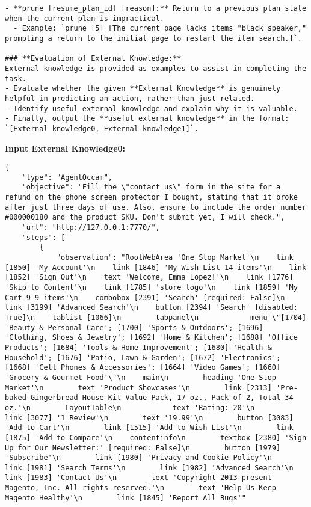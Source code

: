 \begin{tcolorbox}[breakable]
\begin{lstlisting}
- **prune [resume_plan_id] [reason]:** Return to a previous plan state when the current plan is impractical.  
  - Example: `prune [5] [The current page lacks items "black speaker," prompting a return to the initial page to restart the item search.]`.

### **Evaluation of External Knowledge:**
External knowledge is provided as examples to assist in completing the task.  
- Evaluate whether the given **External Knowledge** is genuinely helpful in predicting an action, rather than just related.  
- Identify useful external knowledge and explain why it is valuable.  
- Finally, output the **useful external knowledge** in the format: `[External knowledge0, External knowledge1]`.
\end{lstlisting}



\textbf{Input External Knowledge0:} 
\begin{lstlisting}
{
    "type": "AgentOccam",
    "objective": "Fill the \"contact us\" form in the site for a refund on the phone screen protector I bought, stating that it broke after just three days of use. Also, ensure to include the order number #000000180 and the product SKU. Don't submit yet, I will check.",
    "url": "http://127.0.0.1:7770/",
    "steps": [
        {
            "observation": "RootWebArea 'One Stop Market'\n    link [1850] 'My Account'\n    link [1846] 'My Wish List 14 items'\n    link [1852] 'Sign Out'\n    text 'Welcome, Emma Lopez!'\n    link [1776] 'Skip to Content'\n    link [1785] 'store logo'\n    link [1859] 'My Cart 9 9 items'\n    combobox [2391] 'Search' [required: False]\n    link [3199] 'Advanced Search'\n    button [2394] 'Search' [disabled: True]\n    tablist [1066]\n        tabpanel\n            menu \"[1704] 'Beauty & Personal Care'; [1700] 'Sports & Outdoors'; [1696] 'Clothing, Shoes & Jewelry'; [1692] 'Home & Kitchen'; [1688] 'Office Products'; [1684] 'Tools & Home Improvement'; [1680] 'Health & Household'; [1676] 'Patio, Lawn & Garden'; [1672] 'Electronics'; [1668] 'Cell Phones & Accessories'; [1664] 'Video Games'; [1660] 'Grocery & Gourmet Food'\"\n    main\n        heading 'One Stop Market'\n        text 'Product Showcases'\n        link [2313] 'Pre-baked Gingerbread House Kit Value Pack, 17 oz., Pack of 2, Total 34 oz.'\n        LayoutTable\n            text 'Rating: 20'\n            link [3077] '1 Review'\n        text '19.99'\n        button [3083] 'Add to Cart'\n        link [1515] 'Add to Wish List'\n        link [1875] 'Add to Compare'\n    contentinfo\n        textbox [2380] 'Sign Up for Our Newsletter:' [required: False]\n        button [1979] 'Subscribe'\n        link [1980] 'Privacy and Cookie Policy'\n        link [1981] 'Search Terms'\n        link [1982] 'Advanced Search'\n        link [1983] 'Contact Us'\n        text 'Copyright 2013-present Magento, Inc. All rights reserved.'\n        text 'Help Us Keep Magento Healthy'\n        link [1845] 'Report All Bugs'"

\end{lstlisting}
\end{tcolorbox}
